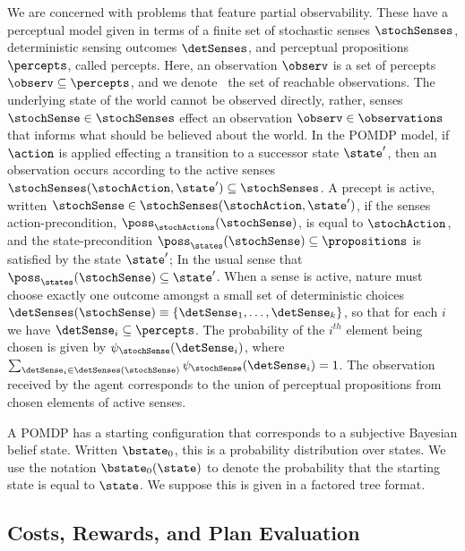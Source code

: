 \documentclass[letterpaper]{article}
\begin{document}
We are concerned with problems that feature partial
observability. These have a perceptual model given in terms of a
finite set of stochastic senses $\stochSenses$, deterministic sensing
outcomes $\detSenses$, and perceptual propositions $\percepts$, called
percepts. Here, an observation $\observ$ is a set of percepts $\observ
\subseteq \percepts$, and we denote \observations\ the set of
reachable observations. The underlying state of the world cannot be
observed directly, rather, senses $\stochSense \in \stochSenses$
effect an observation $\observ \in \observations$ that informs what
should be believed about the world. In the POMDP model, if $\action$
is applied effecting a transition to a successor state $\state'$, then
an observation occurs according to the active senses
$\stochSenses(\stochAction, \state') \subseteq \stochSenses$. A
precept is active, written $\stochSense \in \stochSenses(\stochAction,
\state')$, if the senses action-precondition,
$\poss_\stochActions(\stochSense)$, is equal to $\stochAction$, and
the state-precondition $\poss_\states(\stochSense) \subseteq
\propositions$ is satisfied by the state $\state'$; In the usual sense
that $\poss_\states(\stochSense) \subseteq \state'$.
When a sense is active, nature must choose exactly one outcome amongst
a small set of deterministic choices $\detSenses(\stochSense)
\equiv \{\detSense_1, \ldots, \detSense_k \}$, so that for each
$i$ we have $\detSense_i \subseteq \percepts$. The probability of
the $i^{th}$ element being chosen is given by
$\psi_{\stochSense}(\detSense_i)$, where $\sum_{\detSense_i \in
\detSenses(\stochSense)} \psi_{\stochSense}(\detSense_i) =
1$. The observation received by the agent corresponds to the union of
perceptual propositions from chosen elements of active senses.

A POMDP has a starting configuration that corresponds to a subjective
Bayesian belief state. Written $\bstate_0$, this is a probability
distribution over states. We use the notation $\bstate_0(\state)$ to
denote the probability that the starting state is equal to
$\state$. We suppose this is given in a factored tree format. 



\subsection{Costs, Rewards, and Plan Evaluation}
\end{document}
